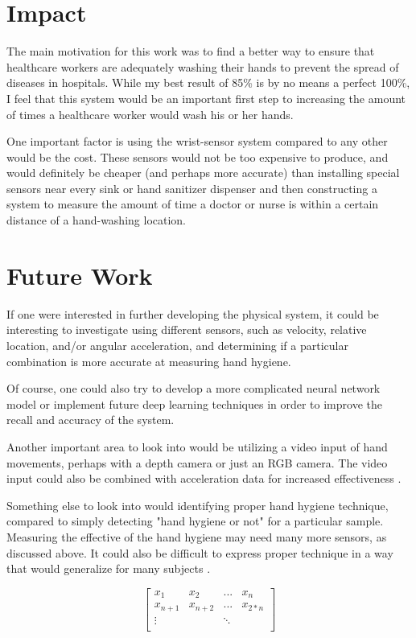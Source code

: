 \documentclass[]{report}
\begin{document}
\section{Impact}

The main motivation for this work was to find a better way to ensure that healthcare workers are adequately washing their hands to prevent the spread of diseases in hospitals. While my best result of 85\% is by no means a perfect 100\%, I feel that this system would be an important first step to increasing the amount of times a healthcare worker would wash his or her hands.

One important factor is using the wrist-sensor system compared to any other would be the cost. These sensors would not be too expensive to produce, and would definitely be cheaper (and perhaps more accurate) than installing special sensors near every sink or hand sanitizer dispenser and then constructing a system to measure the amount of time a doctor or nurse is within a certain distance of a hand-washing location.

\section{Future Work}

If one were interested in further developing the physical system, it could be interesting to investigate using different sensors, such as velocity, relative location, and/or angular acceleration, and determining if a particular combination is more accurate at measuring hand hygiene.

Of course, one could also try to develop a more complicated neural network model or implement future deep learning techniques in order to improve the recall and accuracy of the system.

Another important area to look into would be utilizing a video input of hand movements, perhaps with a depth camera or just an RGB camera. The video input could also be combined with acceleration data for increased effectiveness \cite{NNDL}.

Something else to look into would identifying proper hand hygiene technique, compared to simply detecting "hand hygiene or not" for a particular sample. Measuring the effective of the hand hygiene may need many more sensors, as discussed above. It could also be difficult to express proper technique in a way that would generalize for many subjects \cite{Neverova}.




$$
\left[
\begin{array}{cccc}
x_{1} & x_{2} & ... & x_{n} \\
x_{n+1} & x_{n+2} & ... & x_{2*n} \\
 \vdots & & \ddots & \\


\end{array}
\right]
$$






\end{document}
